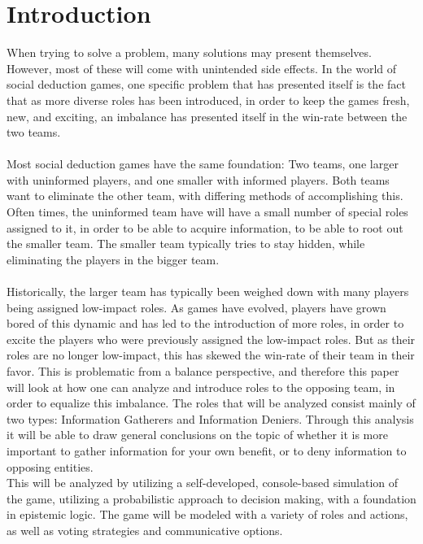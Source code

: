 \section{Introduction}
When trying to solve a problem, many solutions may present themselves. However,
most of these will come with unintended side effects. In the world of social
deduction games, one specific problem that has presented itself is the fact
that as more diverse roles has been introduced, in order to keep the games
fresh, new, and exciting, an imbalance has presented itself in the win-rate
between the two teams. \\ \\ Most social deduction games have the same
foundation: Two teams, one larger with uninformed players, and one smaller with
informed players. Both teams want to eliminate the other team, with differing
methods of accomplishing this. Often times, the uninformed team have will have
a small number of special roles assigned to it, in order to be able to acquire
information, to be able to root out the smaller team. The smaller team
typically tries to stay hidden, while eliminating the players in the bigger
team.\\ \\ Historically, the larger team has typically been weighed down with
many players being assigned low-impact roles. As games have evolved, players
have grown bored of this dynamic and has led to the introduction of more roles,
in order to excite the players who were previously assigned the low-impact
roles. But as their roles are no longer low-impact, this has skewed the
win-rate of their team in their favor. This is problematic from a balance
perspective, and therefore this paper will look at how one can analyze and
introduce roles to the opposing team, in order to equalize this imbalance. The
roles that will be analyzed consist mainly of two types: Information Gatherers
and Information Deniers. Through this analysis it will be able to draw general
conclusions on the topic of whether it is more important to gather information
for your own benefit, or to deny information to opposing entities. \\

This will be analyzed by utilizing a self-developed, console-based simulation
of the game, utilizing a probabilistic approach to decision making, with a
foundation in epistemic logic. The game will be modeled with a variety of roles
and actions, as well as voting strategies and communicative options.

